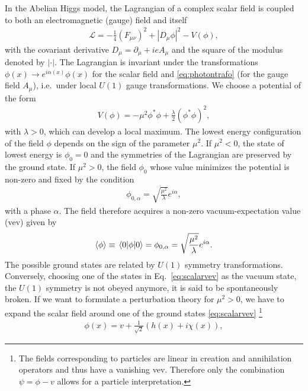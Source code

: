 In the Abelian Higgs model, the Lagrangian of a complex scalar field is coupled to both an electromagnetic (gauge) field and itself 
\begin{align}\label{eq:sclag}
  \mathcal{L} = -\frac{1}{4}(F_{\mu\nu})^2+|D_\mu \phi|^2 - V(\phi),
\end{align}
with the covariant derivative $D_\mu = \partial_\mu + i e A_\mu$ and
the square of the modulus denoted by $|\cdot|$. The
Lagrangian is invariant under the transformations $\phi(x) \rightarrow
e^{i\alpha(x)} \phi(x)$ for the scalar field and
\eqref{eq:photontrafo} (for the gauge field $A_\mu$), i.e.\ under local $U(1)$ gauge
transformations. We choose a potential of the form 
\begin{align}\label{eq:scpot}
  V(\phi) = -\mu^2\phi^*\phi+\frac{\lambda}{2}(\phi^*\phi)^2,
\end{align}
with $\lambda >0$, which can develop a
local maximum. The lowest energy configuration of the field $\phi$ depends on the
sign of the parameter $\mu^2$. If $\mu^2<0$, the state of lowest energy is $\phi_0=0$
and the symmetries of the Lagrangian are preserved by the ground state. 
If $\mu^2>0$, the field $\phi_0$ whose value
minimizes the potential is non-zero and fixed by the condition
\begin{align}\label{eq:alphah}
  \phi_{0,\alpha} = \sqrt{\frac{\mu^2}{\lambda}}e^{i\alpha},
\end{align}
with a phase $\alpha$. The field therefore acquires a non-zero vacuum-expectation value
(vev) given by
\begin{align}\label{eq:scalarvev}
  \expval{\phi}\equiv\expval{\phi}{0} = \phi_{0,\alpha} = \sqrt{\frac{\mu^2}{\lambda}}e^{i\alpha}.
\end{align}
The possible ground states are related by $U(1)$ symmetry
transformations. Conversely, choosing one of the states in Eq.~\eqref{eq:scalarvev}
as the vacuum state, the $U(1)$ symmetry is not obeyed anymore, it is said to be spontaneously
broken. If we want to formulate a perturbation theory for $\mu^2>0$,
we have to expand the scalar field around one of the ground states
\eqref{eq:scalarvev} \footnote{The fields corresponding to particles
  are linear in
  creation and annihilation operators and thus have a vanishing vev. Therefore
  only the combination $\psi = \phi-v$ allows for a particle interpretation.}
\begin{align}
  \phi(x) = v + \frac{1}{\sqrt{2}}\left(h(x)+i\chi(x)\right),
\end{align}
